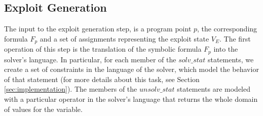 \subsection{Exploit Generation}
The input to the exploit generation step, is a program point $p$, the corresponding formula $F_p$ and a set of assignments representing the exploit state $V_E$. The first operation of this step is the translation of the symbolic formula $F_p$ into the solver's language. In particular, for each member of the $solv\_stat$ statements, we create a set of constraints in the language of the solver, which model the behavior of that statement (for more details about this task, see Section \ref{sec:implementation}). The members of the $unsolv\_stat$ statements are modeled with a particular operator in the solver's language that returns the whole domain of values for the variable.





